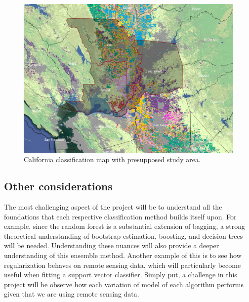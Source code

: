 \documentclass{article}
\begin{document}
\begin{figure}
  \includegraphics[width=\linewidth]{DataMap.png}
  \caption{California classification map with presupposed study area.}
  \label{fig:boat1}
\end{figure}

\subsection{Other considerations}
The most challenging aspect of the project will be to understand all the foundations that each respective classification method builds itself upon. For example, since the random forest is a substantial extension of bagging, a strong theoretical understanding of bootstrap estimation, boosting, and decision trees will be needed. Understanding these nuances will also provide a deeper understanding of this ensemble method. Another example of this is to see how regularization behaves on remote sensing data, which will particularly become useful when fitting a support vector classifier. Simply put, a challenge in this project will be observe how each variation of model of each algorithm performs given that we are using remote sensing data. 
\end{document}
